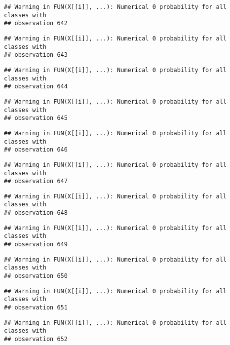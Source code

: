 \documentclass[
]{article}
\begin{document}
\begin{verbatim}
## Warning in FUN(X[[i]], ...): Numerical 0 probability for all classes with
## observation 642
\end{verbatim}

\begin{verbatim}
## Warning in FUN(X[[i]], ...): Numerical 0 probability for all classes with
## observation 643
\end{verbatim}

\begin{verbatim}
## Warning in FUN(X[[i]], ...): Numerical 0 probability for all classes with
## observation 644
\end{verbatim}

\begin{verbatim}
## Warning in FUN(X[[i]], ...): Numerical 0 probability for all classes with
## observation 645
\end{verbatim}

\begin{verbatim}
## Warning in FUN(X[[i]], ...): Numerical 0 probability for all classes with
## observation 646
\end{verbatim}

\begin{verbatim}
## Warning in FUN(X[[i]], ...): Numerical 0 probability for all classes with
## observation 647
\end{verbatim}

\begin{verbatim}
## Warning in FUN(X[[i]], ...): Numerical 0 probability for all classes with
## observation 648
\end{verbatim}

\begin{verbatim}
## Warning in FUN(X[[i]], ...): Numerical 0 probability for all classes with
## observation 649
\end{verbatim}

\begin{verbatim}
## Warning in FUN(X[[i]], ...): Numerical 0 probability for all classes with
## observation 650
\end{verbatim}

\begin{verbatim}
## Warning in FUN(X[[i]], ...): Numerical 0 probability for all classes with
## observation 651
\end{verbatim}

\begin{verbatim}
## Warning in FUN(X[[i]], ...): Numerical 0 probability for all classes with
## observation 652
\end{verbatim}
\end{document}
